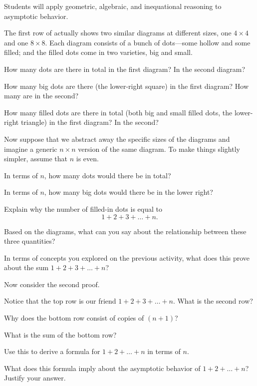 \documentclass{tufte-handout}
\begin{document}
\begin{objective}
  Students will apply geometric, algebraic, and inequational reasoning
  to asymptotic behavior.
\end{objective}

The first row of  actually shows two similar
diagrams at different sizes, one $4 \times 4$ and one $8 \times 8$.
Each diagram consists of a bunch of dots---some hollow and some filled;
and the filled dots come in two varieties, big and small.
\begin{questions}
  \item How many dots are there in total in the first diagram?  In the
    second diagram?
  \item How many big dots are there (\ie the lower-right square) in the
    first diagram?  How many are in the second?
  \item How many filled dots are there in total (both big and small
    filled dots, \ie the lower-right triangle) in the first diagram?
    In the second?
\end{questions}
Now suppose that we abstract away the specific sizes of the diagrams
and imagine a generic $n \times n$ version of the same diagram.  To
make things slightly simpler, assume that $n$ is even.
\begin{questions}
\item In terms of $n$, how many dots would there be in total?
\item In terms of $n$, how many big dots would there be in the lower right?
\item Explain why the number of filled-in dots is equal to \[ 1 + 2 + 3
  + \dots + n. \]
\item Based on the diagrams, what can you say about the relationship
  between these three quantities?
  \newpage
\item In terms of concepts you explored on the previous activity, what
  does this prove about the sum $1 + 2 + 3 + \dots + n$?
\end{questions}
Now consider the second proof.
\begin{questions}
\item Notice that the top row is our friend $1 + 2 + 3 + \dots + n$.
  What is the second row?
\item Why does the bottom row consist of copies of $(n+1)$?
\item What is the sum of the bottom row?
\item Use this to derive a formula for $1 + 2 + \dots + n$ in
  terms of $n$.
\item What does this formula imply about the asymptotic behavior of $1
  + 2 + \dots + n$?  Justify your answer.
\end{questions}
\end{document}
